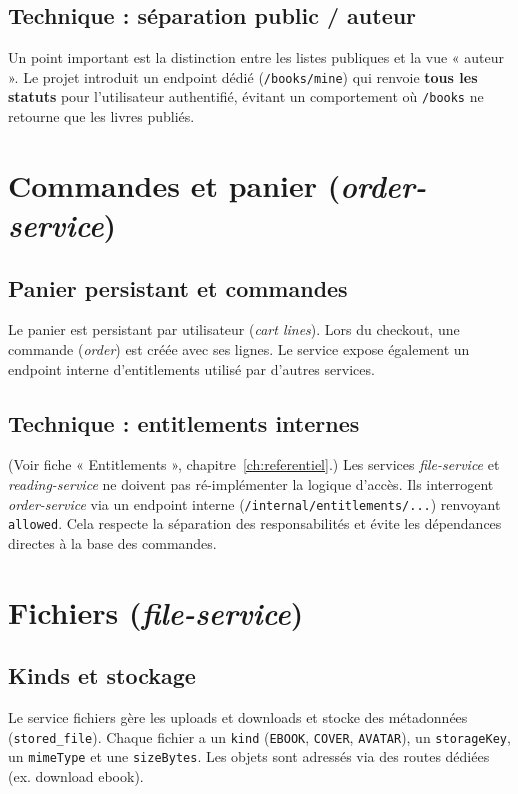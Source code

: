 \documentclass[12pt,a4paper]{report}
\begin{document}
\subsection{Technique : séparation public / auteur}
Un point important est la distinction entre les listes publiques et la vue « auteur ». Le projet introduit un endpoint dédié (\texttt{/books/mine}) qui renvoie \textbf{tous les statuts} pour l'utilisateur authentifié, évitant un comportement où \texttt{/books} ne retourne que les livres publiés.\par

\section{Commandes et panier (\textit{order-service})}
\subsection{Panier persistant et commandes}
Le panier est persistant par utilisateur (\textit{cart lines}). Lors du checkout, une commande (\textit{order}) est créée avec ses lignes. Le service expose également un endpoint interne d'entitlements utilisé par d'autres services.\par

\subsection{Technique : entitlements internes}
(Voir fiche « Entitlements », chapitre~\ref{ch:referentiel}.) Les services \textit{file-service} et \textit{reading-service} ne doivent pas ré-implémenter la logique d'accès. Ils interrogent \textit{order-service} via un endpoint interne (\texttt{/internal/entitlements/...}) renvoyant \texttt{allowed}. Cela respecte la séparation des responsabilités et évite les dépendances directes à la base des commandes.\par

\section{Fichiers (\textit{file-service})}
\subsection{Kinds et stockage}
Le service fichiers gère les uploads et downloads et stocke des métadonnées (\texttt{stored\_file}). Chaque fichier a un \texttt{kind} (\texttt{EBOOK}, \texttt{COVER}, \texttt{AVATAR}), un \texttt{storageKey}, un \texttt{mimeType} et une \texttt{sizeBytes}. Les objets sont adressés via des routes dédiées (ex. download ebook).\par
\end{document}
